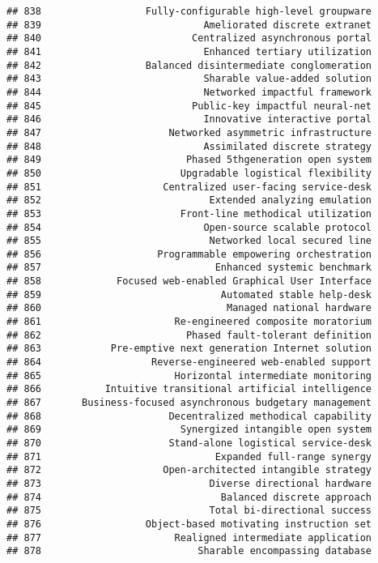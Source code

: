 \documentclass[
]{article}
\begin{document}
\begin{verbatim}
## 838                  Fully-configurable high-level groupware
## 839                            Ameliorated discrete extranet
## 840                          Centralized asynchronous portal
## 841                            Enhanced tertiary utilization
## 842                  Balanced disintermediate conglomeration
## 843                            Sharable value-added solution
## 844                            Networked impactful framework
## 845                          Public-key impactful neural-net
## 846                            Innovative interactive portal
## 847                      Networked asymmetric infrastructure
## 848                            Assimilated discrete strategy
## 849                         Phased 5thgeneration open system
## 850                        Upgradable logistical flexibility
## 851                     Centralized user-facing service-desk
## 852                             Extended analyzing emulation
## 853                        Front-line methodical utilization
## 854                            Open-source scalable protocol
## 855                             Networked local secured line
## 856                    Programmable empowering orchestration
## 857                              Enhanced systemic benchmark
## 858             Focused web-enabled Graphical User Interface
## 859                               Automated stable help-desk
## 860                                Managed national hardware
## 861                       Re-engineered composite moratorium
## 862                         Phased fault-tolerant definition
## 863            Pre-emptive next generation Internet solution
## 864                   Reverse-engineered web-enabled support
## 865                       Horizontal intermediate monitoring
## 866           Intuitive transitional artificial intelligence
## 867       Business-focused asynchronous budgetary management
## 868                      Decentralized methodical capability
## 869                        Synergized intangible open system
## 870                      Stand-alone logistical service-desk
## 871                              Expanded full-range synergy
## 872                     Open-architected intangible strategy
## 873                             Diverse directional hardware
## 874                               Balanced discrete approach
## 875                             Total bi-directional success
## 876                  Object-based motivating instruction set
## 877                       Realigned intermediate application
## 878                           Sharable encompassing database

\end{verbatim}
\end{document}
